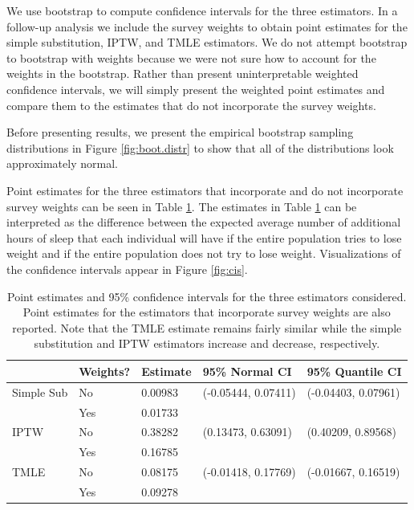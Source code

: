 \documentclass{article}
\begin{document}
We use bootstrap to compute confidence intervals for the three estimators. In a follow-up analysis we include the survey weights to obtain point estimates for the simple substitution, IPTW, and TMLE estimators. We do not attempt bootstrap to bootstrap with weights because we were not sure how to account for the weights in the bootstrap. Rather than present uninterpretable weighted confidence intervals, we will simply present the weighted point estimates and compare them to the estimates that do not incorporate the survey weights.

Before presenting results, we present the empirical bootstrap sampling distributions in Figure \ref{fig:boot.distr} to show that all of the distributions look approximately normal.

Point estimates for the three estimators that incorporate and do not incorporate survey weights can be seen in Table \ref{tab:ests}. The estimates in Table \ref{tab:ests} can be interpreted as the difference between the expected average number of additional hours of sleep that each individual will have if the entire population tries to lose weight and if the entire population does not try to lose weight. Visualizations of the confidence intervals appear in Figure \ref{fig:cis}.

\begin{table}
\begin{tabular}{| l| l | l | l | l |}
  \hline
 & Weights? & Estimate & 95\% Normal CI & 95\% Quantile CI \\ 
  \hline
Simple Sub & No & 0.00983 & (-0.05444, 0.07411) & (-0.04403, 0.07961) \\ 
& Yes & 0.01733 & & \\
\hline
  IPTW & No & 0.38282 & (0.13473, 0.63091) & (0.40209, 0.89568) \\ 
& Yes & 0.16785 & & \\
\hline
  TMLE & No & 0.08175 & (-0.01418, 0.17769) & (-0.01667, 0.16519) \\ 
& Yes & 0.09278 & & \\
   \hline
\end{tabular}
\caption{Point estimates and 95\% confidence intervals for the three estimators considered. Point estimates for the estimators that incorporate survey weights are also reported. Note that the TMLE estimate remains fairly similar while the simple substitution and IPTW estimators increase and decrease, respectively.}
\label{tab:ests}
\end{table}
\end{document}
